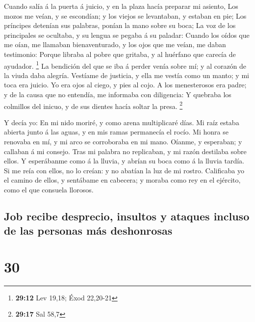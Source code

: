  Cuando salía á la puerta á juicio, y en la plaza hacía
preparar mi asiento,  Los mozos me veían, y se escondían; y
los viejos se levantaban, y estaban en pie;  Los príncipes
detenían sus palabras, ponían la mano sobre su boca;  La
voz de los principales se ocultaba, y su lengua se pegaba á su paladar:
 Cuando los oídos que me oían, me llamaban bienaventurado,
y los ojos que me veían, me daban testimonio:  Porque
libraba al pobre que gritaba, y al huérfano que carecía de ayudador.
\footnote{\textbf{29:12} Lev 19,18; Éxod 22,20-21}  La
bendición del que se iba á perder venía sobre mí; y al corazón de la
viuda daba alegría.  Vestíame de justicia, y ella me vestía
como un manto; y mi toca era juicio.  Yo era ojos al ciego,
y pies al cojo.  A los menesterosos era padre; y de la
causa que no entendía, me informaba con diligencia:  Y
quebraba los colmillos del inicuo, y de sus dientes hacía soltar la
presa. \footnote{\textbf{29:17} Sal 58,7}

 Y decía yo: En mi nido moriré, y como arena multiplicaré
días.  Mi raíz estaba abierta junto á las aguas, y en mis
ramas permanecía el rocío.  Mi honra se renovaba en mí, y
mi arco se corroboraba en mi mano.  Oíanme, y esperaban; y
callaban á mi consejo.  Tras mi palabra no replicaban, y mi
razón destilaba sobre ellos.  Y esperábanme como á la
lluvia, y abrían su boca como á la lluvia tardía.  Si me
reía con ellos, no lo creían: y no abatían la luz de mi rostro.
 Calificaba yo el camino de ellos, y sentábame en cabecera;
y moraba como rey en el ejército, como el que consuela llorosos.

\hypertarget{job-recibe-desprecio-insultos-y-ataques-incluso-de-las-personas-muxe1s-deshonrosas}{%
\subsection{Job recibe desprecio, insultos y ataques incluso de las
personas más
deshonrosas}\label{job-recibe-desprecio-insultos-y-ataques-incluso-de-las-personas-muxe1s-deshonrosas}}

\hypertarget{section-29}{%
\section{30}\label{section-29}}

